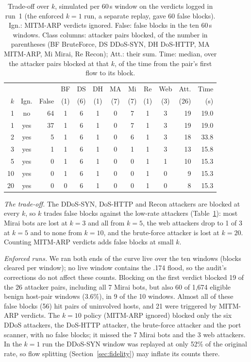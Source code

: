 \begin{table}[t]
\centering
\caption{Trade-off over $k$, simulated per 60\,s window on the verdicts logged in run~1 (the enforced $k=1$ run, a separate replay, gave 60 false blocks). Ign.: MITM-ARP verdicts ignored. False: false blocks in the ten 60\,s windows. Class columns: attacker pairs blocked, of the number in parentheses (BF BruteForce, DS DDoS-SYN, DH DoS-HTTP, MA MITM-ARP, Mi Mirai, Re Recon); Att.: their sum. Time: median, over the attacker pairs blocked at that $k$, of the time from the pair's first flow to its block.}
\label{tab:kcurve}
\footnotesize
\setlength{\tabcolsep}{2.4pt}
\begin{tabular}{rcrcccccccrr}
\toprule
 & & & BF & DS & DH & MA & Mi & Re & Web & Att. & Time \\
$k$ & Ign. & False & (1) & (6) & (1) & (7) & (7) & (1) & (3) & (26) & (s) \\
\midrule
1  & no  & 64 & 1 & 6 & 1 & 0 & 7 & 1 & 3 & 19 & 19.0 \\
1  & yes & 37 & 1 & 6 & 1 & 0 & 7 & 1 & 3 & 19 & 19.0 \\
2  & yes &  5 & 1 & 6 & 1 & 0 & 6 & 1 & 3 & 18 & 33.8 \\
3  & yes &  1 & 1 & 6 & 1 & 0 & 1 & 1 & 3 & 13 & 15.8 \\
5  & yes &  0 & 1 & 6 & 1 & 0 & 0 & 1 & 1 & 10 & 15.3 \\
10 & yes &  0 & 1 & 6 & 1 & 0 & 0 & 1 & 0 &  9 & 15.3 \\
20 & yes &  0 & 0 & 6 & 1 & 0 & 0 & 1 & 0 &  8 & 15.3 \\
\bottomrule
\end{tabular}
\end{table}

\emph{The trade-off.} The DDoS-SYN, DoS-HTTP and Recon attackers are blocked at every $k$, so $k$ trades false blocks against the low-rate attackers (Table~\ref{tab:kcurve}): most Mirai bots are lost at $k=3$ and all from $k=5$, the web attackers drop to 1 of 3 at $k=5$ and to none from $k=10$, and the brute-force attacker is lost at $k=20$. Counting MITM-ARP verdicts adds false blocks at small $k$.

\emph{Enforced runs.} We ran both ends of the curve live over the ten windows (blocks cleared per window); no live window contains the .174 flood, so the audit's corrections do not affect these counts. Blocking on the first verdict blocked 19 of the 26 attacker pairs, including all 7 Mirai bots, but also 60 of 1,674 eligible benign host-pair windows (3.6\%), in 9 of the 10 windows. Almost all of these false blocks (56) hit pairs of uninvolved hosts, and 21 were triggered by MITM-ARP verdicts. The $k=10$ policy (MITM-ARP ignored) blocked only the six DDoS attackers, the DoS-HTTP attacker, the brute-force attacker and the port scanner, with no false blocks; it missed the 7 Mirai bots and the 3 web attackers. In the $k=1$ run the DDoS-SYN window was replayed at only 52\% of the original rate, so flow splitting (Section~\ref{sec:fidelity}) may inflate its counts there.

